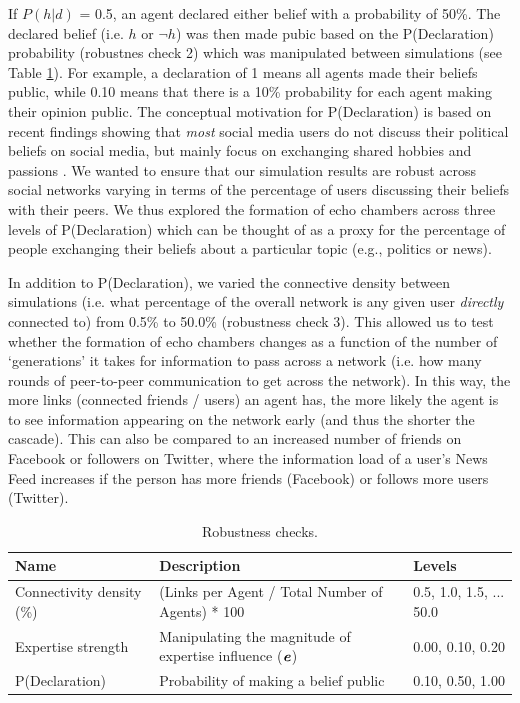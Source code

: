 \documentclass[fleqn,10pt]{wlscirep}
\begin{document}
If \(P(h|d)\) = 0.5, an agent declared either belief with a probability of 50\%. The declared belief (i.e. \(h\) or \(\neg h\))  was then made pubic based on the P(Declaration) probability (robustnes check 2) which was manipulated between simulations (see Table \ref{tab:t1}). For example, a declaration of 1 means all agents made their beliefs public, while 0.10 means that there is a 10\% probability for each agent making their opinion public. The conceptual motivation for P(Declaration) is based on recent findings showing that \emph{most} social media users do not discuss their political beliefs on social media, but mainly focus on exchanging shared hobbies and passions \cite{newman2019reuters}. We wanted to ensure that our simulation results are robust across social networks varying in terms of the percentage of users discussing their beliefs with their peers. We thus explored the formation of echo chambers across three levels of P(Declaration) which can be thought of as a proxy for the percentage of people exchanging their beliefs about a particular topic (e.g., politics or news). 

In addition to P(Declaration), we varied the connective density between simulations (i.e. what percentage of the overall network is any given user \textit{directly} connected to) from 0.5\% to 50.0\% (robustness check 3). This allowed us to test whether the formation of echo chambers changes as a function of the number of `generations' it takes for information to pass across a network (i.e. how many rounds of peer-to-peer communication to get across the network). In this way, the more links (connected friends / users) an agent has, the more likely the agent is to see information appearing on the network early (and thus the shorter the cascade). This can also be compared to an increased number of friends on Facebook or followers on Twitter, where the information load of a user's News Feed increases if the person has more friends (Facebook) or follows more users (Twitter). 


\begin{table}[ht]
\label{tab:robustness_checks}
\centering
\begin{tabular}{|l|l|l|}
\hline
Name & Description & Levels\\
\hline
Connectivity density (\%) & (Links per Agent / Total Number of Agents) * 100 & 0.5, 1.0, 1.5, ... 50.0\\
Expertise strength & Manipulating the magnitude of expertise influence (\(\textbf{\textit{e}}\)) & 0.00, 0.10, 0.20\\
P(Declaration) & Probability of making a belief public & 0.10, 0.50, 1.00\\
\hline
\end{tabular}
\caption{\label{tab:t1}Robustness checks.}
\end{table}
\end{document}
